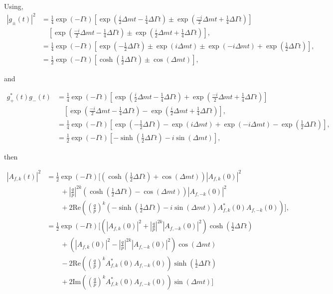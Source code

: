 \documentclass{report}
\def\Deltam{\ensuremath{\Delta m}\xspace}
\def\Deltagamma{\ensuremath{\Delta\Gamma}\xspace}
\def\half{\ensuremath{\frac{1}{2}}\xspace}
\newcommand\magsq[1]{\ensuremath{\left|#1\right|^2}\xspace}
\begin{document}
Using,
\begin{align}
  \magsq{g_\pm(t)} &= \frac{1}{4} \exp(-\Gamma t) \left[\exp\left(\frac{i}{2}\Deltam t - \frac{1}{4} \Deltagamma t\right) \pm \exp\left(\frac{-i}{2}\Deltam t + \frac{1}{4} \Deltagamma t\right)\right] \\
  & \quad \left[\exp\left(\frac{-i}{2}\Deltam t - \frac{1}{4} \Deltagamma t\right) \pm \exp\left(\frac{i}{2}\Deltam t + \frac{1}{4} \Deltagamma t\right)\right], \\
  &= \frac{1}{4} \exp(-\Gamma t) \left[\exp\left(-\half \Deltagamma t\right) \pm \exp\left(i\Deltam t\right) \pm \exp(-i\Deltam t) + \exp\left(\half\Deltagamma t\right)\right], \\
  &= \frac{1}{2} \exp(-\Gamma t)\left[\cosh\left(\half \Deltagamma t\right) \pm \cos(\Deltam t)\right],
\end{align}

and

\begin{align}
  g_+^*(t)g_-(t) &= \frac{1}{4} \exp(-\Gamma t) \left[\exp\left(\frac{i}{2}\Deltam t - \frac{1}{4} \Deltagamma t\right) + \exp\left(\frac{-i}{2}\Deltam t + \frac{1}{4} \Deltagamma t\right)\right] \\
  & \quad \left[\exp\left(\frac{-i}{2}\Deltam t - \frac{1}{4} \Deltagamma t\right) - \exp\left(\frac{i}{2}\Deltam t + \frac{1}{4} \Deltagamma t\right)\right], \\
  &= \frac{1}{4} \exp(-\Gamma t) \left[\exp\left(-\half \Deltagamma t\right) - \exp\left(i\Deltam t\right) + \exp(-i\Deltam t) - \exp\left(\half\Deltagamma t\right)\right], \\
  &= \frac{1}{2} \exp(-\Gamma t)\left[-\sinh\left(\half \Deltagamma t\right) - i \sin(\Deltam t)\right],
\end{align}

then

\begin{align}
  \magsq{A_{f,k}(t)} &= \frac{1}{2} \exp(-\Gamma t)\Bigg[\left(\cosh\left(\half \Deltagamma t\right) + \cos(\Deltam t)\right) \magsq{A_{f,k}(0)} \\
    & \qquad + \left|\frac{q}{p}\right|^{2k} \left(\cosh\left(\half \Deltagamma t\right) - \cos(\Deltam t)\right) \magsq{A_{f,-k}(0)} \\
    & \qquad + 2 \mathrm{Re}\left(\left(\frac{q}{p}\right)^k \left(-\sinh\left(\half \Deltagamma t\right) - i \sin(\Deltam t)\right) A_{f,k}^*(0)A_{f,-k}(0)\right)\Bigg], \\
  &= \frac{1}{2} \exp(-\Gamma t)\Bigg[\left(\magsq{A_{f,k}(0)} + \left|\frac{q}{p}\right|^{2k} \magsq{A_{f,-k}(0)}\right) \cosh\left(\half \Deltagamma t\right) \\
    & \qquad + \left(\magsq{A_{f,k}(0)} - \left|\frac{q}{p}\right|^{2k} \magsq{A_{f,-k}(0)}\right) \cos(\Deltam t) \\
    & \qquad - 2 \mathrm{Re}\left(\left(\frac{q}{p}\right)^k A_{f,k}^*(0)A_{f,-k}(0) \right) \sinh\left(\half \Deltagamma t\right) \\
    & \qquad +2 \mathrm{Im}\left(\left(\frac{q}{p}\right)^k A_{f,k}^*(0)A_{f,-k}(0)\right) \sin(\Deltam t) \Bigg]
\end{align}
\end{document}
